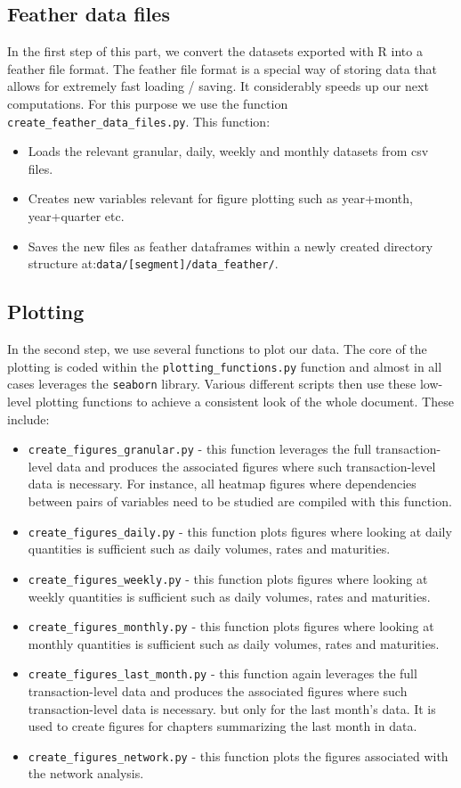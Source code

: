 \subsection{Feather data files}
In the first step of this part, we convert the datasets exported with R into a feather file format. The feather file format is a special way of storing data that allows for extremely fast loading / saving. It considerably speeds up our  next computations. For this purpose we use the function \verb|create_feather_data_files.py|. This function:
\begin{itemize}
	\item Loads the relevant granular, daily, weekly and monthly datasets from csv files.
	\item Creates new variables relevant for figure plotting such as year+month, year+quarter etc.
	\item Saves the new files as feather dataframes within a newly created directory structure at:\newline\verb|data/[segment]/data_feather/|.
\end{itemize}

\subsection{Plotting}
In the second step, we use several functions to plot our data. The core of the plotting is coded within the \verb|plotting_functions.py| function and almost in all cases leverages the \verb|seaborn| library. Various different scripts then use these low-level plotting functions to achieve a consistent look of the whole document. These include:
\begin{itemize}
	\item \verb|create_figures_granular.py| - this function leverages the full transaction-level data and produces the associated figures where such transaction-level data is necessary. For instance, all heatmap figures where dependencies between pairs of variables need to be studied are compiled with this function.
	\item \verb|create_figures_daily.py| - this function plots figures where looking at daily quantities is sufficient such as daily volumes, rates and maturities.
	\item \verb|create_figures_weekly.py| - this function plots figures where looking at weekly quantities is sufficient such as daily volumes, rates and maturities.
	\item \verb|create_figures_monthly.py| - this function plots figures where looking at monthly quantities is sufficient such as daily volumes, rates and maturities.
	\item \verb|create_figures_last_month.py| - this function again leverages the full transaction-level data and produces the associated figures where such transaction-level data is necessary. but only for the last month's data. It is used to create figures for chapters summarizing the last month in data.
	\item \verb|create_figures_network.py| - this function plots the figures associated with the network analysis.
\end{itemize}

